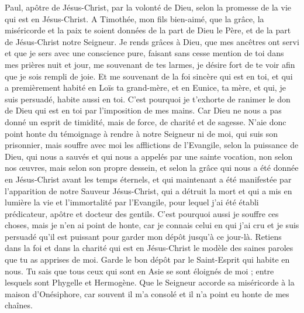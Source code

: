 \begin{multicols}{2}
\VerseOne{}Paul, apôtre de Jésus-Christ, par la volonté de Dieu, selon la promesse de la vie qui est en Jésus-Christ.
A Timothée, mon fils bien-aimé, que la grâce, la miséricorde et la paix te soient données de la part de Dieu le Père, et de la part de Jésus-Christ notre Seigneur.
Je rends grâces à Dieu, que mes ancêtres ont servi et que je sers avec une conscience pure, faisant sans cesse mention de toi dans mes prières nuit et jour,
me souvenant de tes larmes, je désire fort de te voir afin que je sois rempli de joie.
Et me souvenant de la foi sincère qui est en toi, et qui a premièrement habité en Loïs ta grand-mère, et en Eunice, ta mère, et qui, je suis persuadé, habite aussi en toi.
C'est pourquoi je t'exhorte de ranimer le don de Dieu qui est en toi par l'imposition de mes mains.
Car Dieu ne nous a pas donné un esprit de timidité, mais de force, de charité et de sagesse.
N’aie donc point honte du témoignage à rendre à notre Seigneur ni de moi, qui suis son prisonnier, mais souffre avec moi les afflictions de l'Evangile, selon la puissance de Dieu,
qui nous a sauvés et qui nous a appelés par une sainte vocation, non selon nos œuvres, mais selon son propre dessein, et selon la grâce qui nous a été donnée en Jésus-Christ avant les temps éternels,
et qui maintenant a été manifestée par l'apparition de notre Sauveur Jésus-Christ, qui a détruit la mort et qui a mis en lumière la vie et l'immortalité par l'Evangile,
pour lequel j'ai été établi prédicateur, apôtre et docteur des gentils.
C'est pourquoi aussi je souffre ces choses, mais je n'en ai point de honte, car je connais celui en qui j'ai cru et je suis persuadé qu'il est puissant pour garder mon dépôt jusqu'à ce jour-là.
Retiens dans la foi et dans la charité qui est en Jésus-Christ le modèle des saines paroles que tu as apprises de moi.
Garde le bon dépôt par le Saint-Esprit qui habite en nous.
Tu sais que tous ceux qui sont en Asie se sont éloignés de moi ; entre lesquels sont Phygelle et Hermogène.
Que le Seigneur accorde sa miséricorde à la maison d'Onésiphore, car souvent il m'a consolé et il n'a point eu honte de mes chaînes.

\end{multicols}
